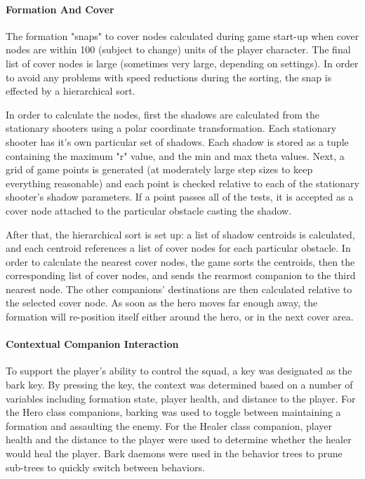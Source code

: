 \documentclass[11pt]{article}
\begin{document}
\paragraph{Formation And Cover}
The formation "snaps" to cover nodes calculated during game start-up when cover nodes are within 100 (subject to change) units of the player character.  The final list of cover nodes is large (sometimes very large, depending on settings).  In order to avoid any problems with speed reductions during the sorting, the snap is effected by a hierarchical sort.  

In order to calculate the nodes, first the shadows are calculated from the stationary shooters using a polar coordinate transformation.  Each stationary shooter has it's own particular set of shadows.  Each shadow is stored as a tuple containing the maximum "r" value, and the min and max theta values.  Next, a grid of game points is generated (at moderately large step sizes to keep everything reasonable) and each point is checked relative to each of the stationary shooter's shadow parameters.  If a point passes all of the tests, it is accepted as a cover node attached to the particular obstacle casting the shadow.  

After that, the hierarchical sort is set up: a list of shadow centroids is calculated, and each centroid references a list of cover nodes for each particular obstacle. In order to calculate the nearest cover nodes, the game sorts the centroids, then the corresponding list of cover nodes, and sends the rearmost companion to the third nearest node.  The other companions' destinations are then calculated relative to the selected cover node.  As soon as the hero moves far enough away, the formation will re-position itself either around the hero, or in the next cover area.     

\paragraph{Contextual Companion Interaction}
To support the player's ability to control the squad, a key was designated as the bark key. By pressing the key, the context was determined based on a number of variables including formation state, player health, and distance to the player. For the Hero class companions, barking was used to toggle between maintaining a formation and assaulting the enemy. For the Healer class companion, player health and the distance to the player were used to determine whether the healer would heal the player. Bark daemons were used in the behavior trees to prune sub-trees to quickly switch between behaviors. 
\end{document}
